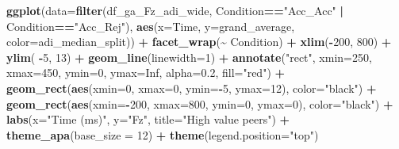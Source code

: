 \documentclass[
]{article}
\newenvironment{Shaded}{\begin{snugshade}}{\end{snugshade}}
\newcommand{\AttributeTok}[1]{\textcolor[rgb]{0.13,0.29,0.53}{#1}}
\newcommand{\ConstantTok}[1]{\textcolor[rgb]{0.56,0.35,0.01}{#1}}
\newcommand{\DecValTok}[1]{\textcolor[rgb]{0.00,0.00,0.81}{#1}}
\newcommand{\FloatTok}[1]{\textcolor[rgb]{0.00,0.00,0.81}{#1}}
\newcommand{\FunctionTok}[1]{\textcolor[rgb]{0.13,0.29,0.53}{\textbf{#1}}}
\newcommand{\NormalTok}[1]{#1}
\newcommand{\SpecialCharTok}[1]{\textcolor[rgb]{0.81,0.36,0.00}{\textbf{#1}}}
\newcommand{\StringTok}[1]{\textcolor[rgb]{0.31,0.60,0.02}{#1}}
\begin{document}
\begin{Shaded}
\begin{Highlighting}[]
\FunctionTok{ggplot}\NormalTok{(}\AttributeTok{data=}\FunctionTok{filter}\NormalTok{(df\_ga\_Fz\_adi\_wide, Condition}\SpecialCharTok{==}\StringTok{"Acc\_Acc"} \SpecialCharTok{|}\NormalTok{ Condition}\SpecialCharTok{==}\StringTok{"Acc\_Rej"}\NormalTok{), }\FunctionTok{aes}\NormalTok{(}\AttributeTok{x=}\NormalTok{Time, }\AttributeTok{y=}\NormalTok{grand\_average, }\AttributeTok{color=}\NormalTok{adi\_median\_split)) }\SpecialCharTok{+}
  \FunctionTok{facet\_wrap}\NormalTok{(}\SpecialCharTok{\textasciitilde{}}\NormalTok{ Condition) }\SpecialCharTok{+}
  \FunctionTok{xlim}\NormalTok{(}\SpecialCharTok{{-}}\DecValTok{200}\NormalTok{, }\DecValTok{800}\NormalTok{) }\SpecialCharTok{+}
  \FunctionTok{ylim}\NormalTok{( }\SpecialCharTok{{-}}\DecValTok{5}\NormalTok{, }\DecValTok{13}\NormalTok{) }\SpecialCharTok{+}
  \FunctionTok{geom\_line}\NormalTok{(}\AttributeTok{linewidth=}\DecValTok{1}\NormalTok{) }\SpecialCharTok{+}
  \FunctionTok{annotate}\NormalTok{(}\StringTok{"rect"}\NormalTok{, }\AttributeTok{xmin=}\DecValTok{250}\NormalTok{, }\AttributeTok{xmax=}\DecValTok{450}\NormalTok{, }\AttributeTok{ymin=}\DecValTok{0}\NormalTok{, }\AttributeTok{ymax=}\ConstantTok{Inf}\NormalTok{, }\AttributeTok{alpha=}\FloatTok{0.2}\NormalTok{, }\AttributeTok{fill=}\StringTok{"red"}\NormalTok{) }\SpecialCharTok{+}
  \FunctionTok{geom\_rect}\NormalTok{(}\FunctionTok{aes}\NormalTok{(}\AttributeTok{xmin=}\DecValTok{0}\NormalTok{, }\AttributeTok{xmax=}\DecValTok{0}\NormalTok{, }\AttributeTok{ymin=}\SpecialCharTok{{-}}\DecValTok{5}\NormalTok{, }\AttributeTok{ymax=}\DecValTok{12}\NormalTok{), }\AttributeTok{color=}\StringTok{"black"}\NormalTok{) }\SpecialCharTok{+}
  \FunctionTok{geom\_rect}\NormalTok{(}\FunctionTok{aes}\NormalTok{(}\AttributeTok{xmin=}\SpecialCharTok{{-}}\DecValTok{200}\NormalTok{, }\AttributeTok{xmax=}\DecValTok{800}\NormalTok{, }\AttributeTok{ymin=}\DecValTok{0}\NormalTok{, }\AttributeTok{ymax=}\DecValTok{0}\NormalTok{), }\AttributeTok{color=}\StringTok{"black"}\NormalTok{) }\SpecialCharTok{+}
  \FunctionTok{labs}\NormalTok{(}\AttributeTok{x=}\StringTok{"Time (ms)"}\NormalTok{, }\AttributeTok{y=}\StringTok{"Fz"}\NormalTok{, }\AttributeTok{title=}\StringTok{"High value peers"}\NormalTok{) }\SpecialCharTok{+}
  \FunctionTok{theme\_apa}\NormalTok{(}\AttributeTok{base\_size =} \DecValTok{12}\NormalTok{) }\SpecialCharTok{+} \FunctionTok{theme}\NormalTok{(}\AttributeTok{legend.position=}\StringTok{"top"}\NormalTok{)}
\end{Highlighting}
\end{Shaded}
\end{document}
